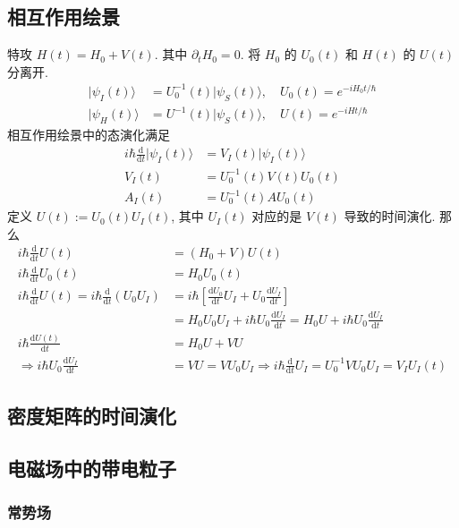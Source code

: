 \documentclass[../../main.tex]{subfiles}
\begin{document}
\subsection{相互作用绘景}
特攻 $H(t) = H_{0} + V(t)$. 其中 $\partial_{t}H_{0}=0$. 将 $H_{0}$ 的 $U_{0}(t)$ 和 $H(t)$ 的 $U(t)$ 分离开. 
\begin{align*}
    |\psi_{I}(t)\rangle &= U_{0}^{-1}(t)|\psi_{S}(t)\rangle,\quad U_{0}(t) = e^{-iH_{0}t/\hbar}\\
    |\psi_{H}(t)\rangle &= U^{-1}(t)|\psi_{S}(t)\rangle,\quad U(t) = e^{-iHt/\hbar}
\end{align*}
相互作用绘景中的态演化满足
\begin{align*}
    i\hbar\frac{\mathrm{d}}{\mathrm{d}t} |\psi_{I}(t)\rangle &= V_{I}(t)|\psi_{I}(t)\rangle\\
    V_{I}(t) &= U_{0}^{-1}(t)V(t)U_{0}(t)\\
    A_{I}(t) &= U_{0}^{-1}(t)AU_{0}(t)
\end{align*}
定义 $U(t):=U_{0}(t)U_{I}(t)$, 其中 $U_{I}(t)$ 对应的是 $V(t)$ 导致的时间演化. 那么
\begin{align*}
    i\hbar\frac{\mathrm{d}}{\mathrm{d}t}U(t) &= (H_{0}+V)U(t)\\
    i\hbar\frac{\mathrm{d}}{\mathrm{d}t}U_{0}(t) &= H_{0}U_{0}(t)\\
    i\hbar\frac{\mathrm{d}}{\mathrm{d}t}U(t) = i\hbar\frac{\mathrm{d}}{\mathrm{d}t}(U_{0}U_{I}) &= i\hbar\left[\frac{\mathrm{d}U_{0}}{\mathrm{d}t}U_{I} + U_{0}\frac{\mathrm{d}U_{I}}{\mathrm{d}t}\right]\\
    &= H_{0}U_{0}U_{I} + i\hbar U_{0}\frac{\mathrm{d}U_{I}}{\mathrm{d}t} = H_{0}U + i\hbar U_{0}\frac{\mathrm{d}U_{I}}{\mathrm{d}t}\\
    i\hbar\frac{\mathrm{d}U(t)}{\mathrm{d}t} &= H_{0}U + VU\\
    \Rightarrow i\hbar U_{0}\frac{\mathrm{d}U_{I}}{\mathrm{d}t} &= VU = VU_{0}U_{I}\Rightarrow i\hbar\frac{\mathrm{d}}{\mathrm{d}t}U_{I} = U_{0}^{-1}VU_{0}U_{I} = V_{I}U_{I}(t)
\end{align*}
\subsection{密度矩阵的时间演化}

\subsection{电磁场中的带电粒子}
\subsubsection{常势场}
\end{document}
